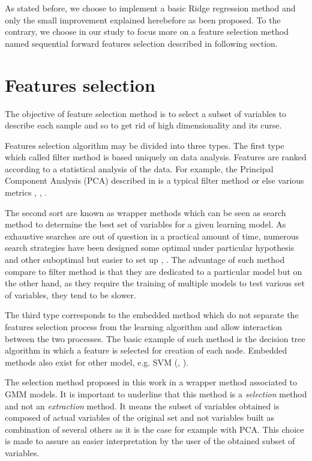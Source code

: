 \documentclass[a4paper,11pt,DIV=16,abstracton]{scrartcl}
\begin{document}
    As stated before, we choose to implement a basic Ridge regression method and only the small improvement explained herebefore as been proposed. To the contrary, we choose in our study to focus more on a feature selection method named sequential forward features selection described in following section.

\section{Features selection}
\label{sec:selection}

The objective of feature selection method is to select a subset of variables to describe each sample and so to get rid of high dimensionality and its curse.

Features selection algorithm may be divided into three types. The first type which called filter method is based uniquely on data analysis. Features are ranked according to a statistical analysis of the data. For example, the Principal Component Analysis (PCA) described in \cite{jimenez1998supervised} is a typical filter method or else various metrics \cite{bruzzone1995extension}, \cite{biesiada2007feature}, \cite{demir2008phase}.

The second sort are known as wrapper methods which can be seen as search method to determine the best set of variables for a given learning model. As exhaustive searches are out of question in a practical amount of time, numerous search strategies have been designed some optimal under particular hypothesis \cite{narendra1977branch} and other suboptimal but easier to set up \cite{whitney1971direct}, \cite{somol1999adaptive}. The advantage of such method compare to filter method is that they are dedicated to a particular model but on the other hand, as they require the training of multiple models to test various set of variables, they tend to be slower.

The third type corresponds to the embedded method which do not separate the features selection process from the learning algorithm and allow interaction between the two processes. The basic example of such method is the decision tree algorithm in which a feature is selected for creation of each node. Embedded methods also exist for other model, e.g. SVM (\cite{guyon2002gene}, \cite{weston2003use}).

The selection method proposed in this work in a wrapper method associated to GMM models. It is important to underline that this method is a \emph{selection} method and not an \emph{extraction} method. It means the subset of variables obtained is composed of actual variables of the original set and not variables built as combination of several others as it is the case for example with PCA. This choice is made to assure an easier interpretation by the user of the obtained subset of variables.
\end{document}
